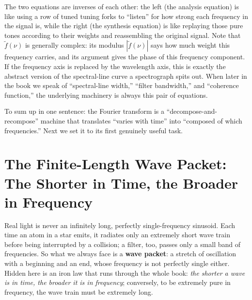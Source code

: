 The two equations are inverses of each other: the left (the analysis equation) is like using a row of tuned tuning forks to ``listen'' for how strong each frequency in the signal is, while the right (the synthesis equation) is like replaying those pure tones according to their weights and reassembling the original signal. Note that \(\tilde f(\nu)\) is generally complex: its modulus \(|\tilde f(\nu)|\) says how much weight this frequency carries, and its argument gives the phase of this frequency component. If the frequency axis is replaced by the wavelength axis, this is exactly the abstract version of the spectral-line curve a spectrograph spits out. When later in the book we speak of ``spectral-line width,'' ``filter bandwidth,'' and ``coherence function,'' the underlying machinery is always this pair of equations.

To sum up in one sentence: the Fourier transform is a ``decompose-and-recompose'' machine that translates ``varies with time'' into ``composed of which frequencies.'' Next we set it to its first genuinely useful task.

\section{The Finite-Length Wave Packet: The Shorter in Time, the Broader in Frequency}
\label{sec:e02-wavepacket}

Real light is never an infinitely long, perfectly single-frequency sinusoid. Each time an atom in a star emits, it radiates only an extremely short wave train before being interrupted by a collision; a filter, too, passes only a small band of frequencies. So what we always face is a \textbf{wave packet}: a stretch of oscillation with a beginning and an end, whose frequency is not perfectly single either. Hidden here is an iron law that runs through the whole book: \emph{the shorter a wave is in time, the broader it is in frequency}; conversely, to be extremely pure in frequency, the wave train must be extremely long.

